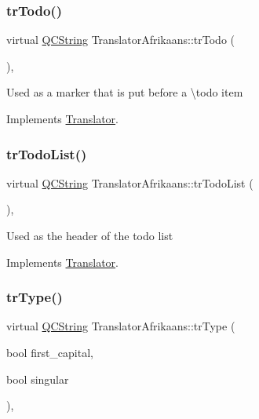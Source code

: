 \subsubsection{\texorpdfstring{trTodo()}{trTodo()}}
{\footnotesize\ttfamily virtual \mbox{\hyperlink{class_q_c_string}{Q\+C\+String}} Translator\+Afrikaans\+::tr\+Todo (\begin{DoxyParamCaption}{ }\end{DoxyParamCaption})\hspace{0.3cm}{\ttfamily [inline]}, {\ttfamily [virtual]}}

Used as a marker that is put before a \textbackslash{}todo item 

Implements \mbox{\hyperlink{class_translator}{Translator}}.

\mbox{\label{class_translator_afrikaans_abf5538afae83e82ec2d0886af39495f0}} 
\subsubsection{\texorpdfstring{trTodoList()}{trTodoList()}}
{\footnotesize\ttfamily virtual \mbox{\hyperlink{class_q_c_string}{Q\+C\+String}} Translator\+Afrikaans\+::tr\+Todo\+List (\begin{DoxyParamCaption}{ }\end{DoxyParamCaption})\hspace{0.3cm}{\ttfamily [inline]}, {\ttfamily [virtual]}}

Used as the header of the todo list 

Implements \mbox{\hyperlink{class_translator}{Translator}}.

\mbox{\label{class_translator_afrikaans_a3c1346bb5addbecf5566e003bd1d5b08}} 
\subsubsection{\texorpdfstring{trType()}{trType()}}
{\footnotesize\ttfamily virtual \mbox{\hyperlink{class_q_c_string}{Q\+C\+String}} Translator\+Afrikaans\+::tr\+Type (\begin{DoxyParamCaption}\item[{bool}]{first\+\_\+capital,  }\item[{bool}]{singular }\end{DoxyParamCaption})\hspace{0.3cm}{\ttfamily [inline]}, {\ttfamily [virtual]}}

